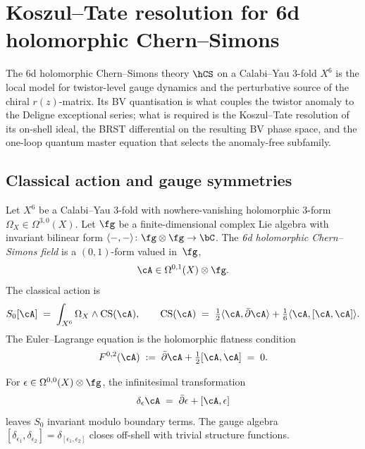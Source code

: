 \section{Koszul--Tate resolution for 6d holomorphic Chern--Simons}
\label{sec:vol2-bvbrst-kt-6dhcs}


The 6d holomorphic Chern--Simons theory $\hCS$ on a Calabi--Yau
3-fold $X^6$ is the local model for twistor-level gauge dynamics
and the perturbative source of the chiral $r(z)$-matrix. Its BV
quantisation is what couples the twistor anomaly to the Deligne exceptional series; what
is required is the Koszul--Tate resolution of its on-shell ideal,
the BRST differential on the resulting BV phase space, and the
one-loop quantum master equation that selects the anomaly-free
subfamily.

\subsection{Classical action and gauge symmetries}
\label{subsec:6dhcs-action}

\begin{definition}
\label{def:6dhcs-action}
Let $X^6$ be a Calabi--Yau 3-fold with nowhere-vanishing holomorphic
3-form $\Omega_X \in \Omega^{3,0}(X)$. Let $\fg$ be a finite-dimensional
complex Lie algebra with invariant bilinear form
$\langle -, - \rangle \colon \fg \otimes \fg \to \bC$. The \emph{6d
holomorphic Chern--Simons field} is a $(0,1)$-form valued in~$\fg$,
\[
 \cA \in \Omega^{0,1}(X) \otimes \fg.
\]
The classical action is
\begin{equation}\label{eq:6dhcs-classical-action}
 S_0[\cA]
 \;=\;
 \int_{X^6} \Omega_X \wedge \mathrm{CS}(\cA),
 \qquad
 \mathrm{CS}(\cA)
 \;=\;
 \tfrac12 \langle \cA, \bar\partial \cA\rangle
 + \tfrac16 \langle \cA, [\cA, \cA]\rangle.
\end{equation}
The Euler--Lagrange equation is the holomorphic flatness condition
\begin{equation}\label{eq:6dhcs-el}
 F^{0,2}(\cA) \;:=\; \bar\partial \cA + \tfrac12[\cA, \cA] \;=\; 0.
\end{equation}
\end{definition}

\begin{lemma}
\label{lem:6dhcs-gauge}
For $\epsilon \in \Omega^{0,0}(X) \otimes \fg$, the infinitesimal
transformation
\begin{equation}\label{eq:6dhcs-gauge}
 \delta_\epsilon \cA \;=\; \bar\partial \epsilon + [\cA, \epsilon]
\end{equation}
leaves $S_0$ invariant modulo boundary terms. The gauge algebra
$[\delta_{\epsilon_1}, \delta_{\epsilon_2}] = \delta_{[\epsilon_1,
\epsilon_2]}$ closes off-shell with trivial structure functions.
\end{lemma}


